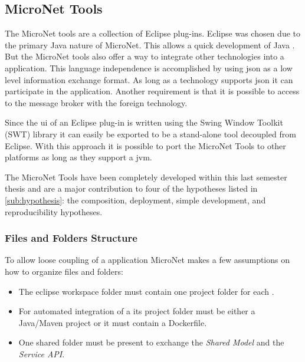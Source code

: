 \subsection{MicroNet Tools}
\label{sub:tools}

The MicroNet tools are a collection of Eclipse plug-ins. Eclipse was chosen due
to the primary Java nature of MicroNet. This allows a quick development of Java
\mss{}. But the MicroNet tools also offer a way to integrate other
technologies into a \ms{} application. This language independence is
accomplished by using \gls{json} as a low level information exchange format. As
long as a technology supports \gls{json} it can participate in the application.
Another requirement is that it is possible to access to the message broker with
the foreign technology.

Since the \gls{ui} of an Eclipse plug-in is written using the Swing
Window Toolkit (SWT) library it can easily be exported to be a stand-alone tool
decoupled from Eclipse. With this approach it is possible to port the MicroNet
Tools to other platforms as long as they support a \gls{jvm}.

The MicroNet Tools have been completely developed within this last semester
thesis and are a major contribution to four of the hypotheses listed in
\autoref{sub:hypothesis}: the composition, deployment, simple development, and 
reproducibility hypotheses.

\subsubsection{Files and Folders Structure}

To allow loose coupling of a \ms{} application MicroNet makes a few assumptions
on how to organize files and folders:

\begin{itemize}
  \item The eclipse workspace folder must contain one project folder for each
  \ms{}.
  \item For automated integration of a \ms{} its project folder must be either a
  Java/Maven project or it must contain a Dockerfile.
 \item One shared folder must be present to exchange the \textit{Shared Model} and the
  \textit{Service API}.
\end{itemize}  


